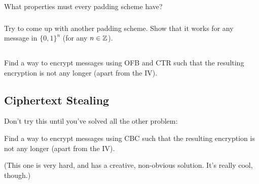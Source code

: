 \documentclass[12pt]{article}
\begin{document}
What properties must every padding scheme have?

\subsubsection{}
Try to come up with another padding scheme. Show that it works for any message in $\{0, 1\}^n$ (for any $n \in \mathbb{Z}$).

\subsection{}

Find a way to encrypt messages using OFB and CTR such that the resulting encryption is not any longer (apart from the IV).

\subsection{Ciphertext Stealing}

Don't try this until you've solved all the other problem:

Find a way to encrypt messages using CBC such that the resulting encryption is not any longer (apart from the IV).

(This one is very hard, and has a creative, non-obvious solution. It's really cool, though.)
\end{document}
